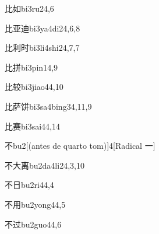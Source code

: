 \begin{verbete}{比如}{bi3ru2}{4,6}
\end{verbete}

\begin{verbete}{比亚迪}{bi3ya4di2}{4,6,8}
\end{verbete}

\begin{verbete}{比利时}{bi3li4shi2}{4,7,7}
\end{verbete}

\begin{verbete}{比拼}{bi3pin1}{4,9}
\end{verbete}

\begin{verbete}{比较}{bi3jiao4}{4,10}
\end{verbete}

\begin{verbete}{比萨饼}{bi3sa4bing3}{4,11,9}
\end{verbete}

\begin{verbete}{比赛}{bi3sai4}{4,14}
\end{verbete}

\begin{verbete}{不}{bu2}[(antes de quarto tom)]{4}[Radical 一]
\end{verbete}

\begin{verbete}{不大离}{bu2da4li2}{4,3,10}
\end{verbete}

\begin{verbete}{不日}{bu2ri4}{4,4}
\end{verbete}

\begin{verbete}{不用}{bu2yong4}{4,5}
\end{verbete}

\begin{verbete}{不过}{bu2guo4}{4,6}
\end{verbete}

